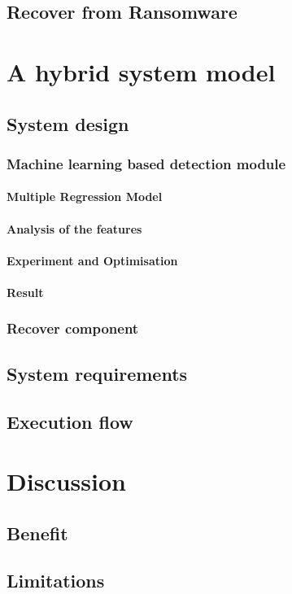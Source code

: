 \documentclass[]{PLR-ShaofengLiu}
\begin{document}
  \section{Recover from Ransomware}
\chapter{A hybrid system model}
  \section{System design}
    \subsection{Machine learning based detection module}
        \subsubsection{Multiple Regression Model}
        \subsubsection{Analysis of the features}
        \subsubsection{Experiment and Optimisation}
        \subsubsection{Result} 
      \subsection{Recover component}
  \section{System requirements}
  \section{Execution flow}
\chapter{Discussion}
  \section{Benefit}
  \section{Limitations}
\end{document}
